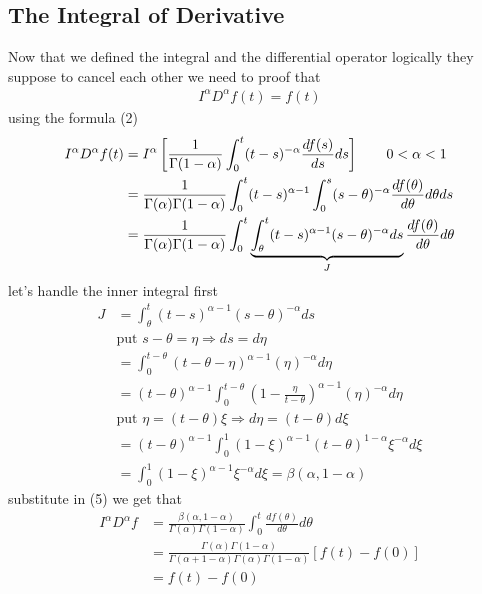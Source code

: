 \documentclass[]{article}
\begin{document}
\subsection{The Integral of Derivative}
Now that we defined the integral and the differential operator logically they suppose to cancel each other
we need to proof that
\begin{align*}
    I^{\alpha}D^{\alpha}f(t) = f(t)
\end{align*}
using the formula (2)
\begin{align}
    \notag
    I^{\alpha}D^{\alpha}f(t) &= I^{\alpha}\left[\frac{1}{\Gamma(1-\alpha)}\int_{0}^{t}(t-s)^{-\alpha}\frac{d f(s)}{ds}ds\right] \qquad 0 < \alpha < 1
    \\\notag
    &= \frac{1}{\Gamma(\alpha)\Gamma(1-\alpha)} \int_{0}^{t}(t-s)^{\alpha-1} \int_{0}^{s}(s-\theta)^{-\alpha} \frac{d f(\theta)}{d\theta} d\theta ds
    \\
    &= \frac{1}{\Gamma(\alpha)\Gamma(1-\alpha)} \int_{0}^{t}\underbrace{\int_{\theta}^{t}(t-s)^{\alpha-1}(s-\theta)^{-\alpha} ds}_J  \frac{d f(\theta)}{d\theta} d\theta
\end{align}
let's handle the inner integral first
\begin{align*}
    J &= \int_{\theta}^{t}(t-s)^{\alpha-1}(s-\theta)^{-\alpha} ds
    \\
    &\text{put } s-\theta = \eta \Longrightarrow ds = d\eta
    \\
    &= \int_{0}^{t-\theta}(t-\theta-\eta)^{\alpha-1}(\eta)^{-\alpha} d\eta
    \\
    &= (t-\theta)^{\alpha-1} \int_{0}^{t-\theta}(1-\frac{\eta}{t-\theta})^{\alpha-1}(\eta)^{-\alpha} d\eta
    \\
    &\text{put } \eta = (t-\theta)\xi  \Longrightarrow d\eta = (t-\theta)d\xi
    \\
    &= (t-\theta)^{\alpha-1} \int_{0}^{1}(1-\xi)^{\alpha-1} (t-\theta)^{1-\alpha} \xi^{-\alpha} d\xi
    \\
    &= \int_{0}^{1}(1-\xi)^{\alpha-1} \xi^{-\alpha} d\xi = \beta(\alpha,1-\alpha)
\end{align*}
substitute in (5) we get that
\begin{align*}
    I^{\alpha}D^{\alpha}f &= \frac{\beta(\alpha,1-\alpha)}{\Gamma(\alpha)\Gamma(1-\alpha)}\int_{0}^{t}\frac{d f(\theta)}{d\theta} d\theta
    \\
    &= \frac{\Gamma(\alpha)\Gamma(1-\alpha)}{\Gamma(\alpha+1-\alpha)\Gamma(\alpha)\Gamma(1-\alpha)}[f(t)-f(0)] 
    \\
    &= f(t)-f(0)
\end{align*}
\setcounter{equation}{0}
\newpage
\end{document}
